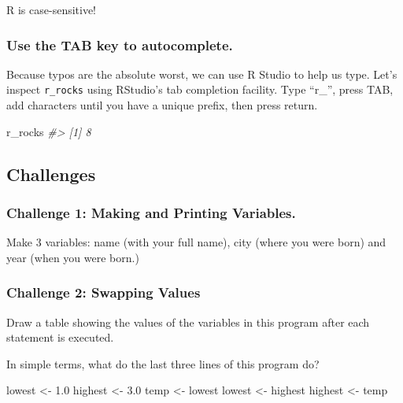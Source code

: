 \documentclass[]{book}
\newenvironment{Shaded}{\begin{snugshade}}{\end{snugshade}}
\newcommand{\CommentTok}[1]{\textcolor[rgb]{0.56,0.35,0.01}{\textit{#1}}}
\newcommand{\FloatTok}[1]{\textcolor[rgb]{0.00,0.00,0.81}{#1}}
\newcommand{\NormalTok}[1]{#1}
\newcommand{\StringTok}[1]{\textcolor[rgb]{0.31,0.60,0.02}{#1}}
\begin{document}
R is case-sensitive!

\hypertarget{use-the-tab-key-to-autocomplete.}{%
\subsubsection*{Use the TAB key to autocomplete.}\label{use-the-tab-key-to-autocomplete.}}

Because typos are the absolute worst, we can use R Studio to help us type. Let's inspect \texttt{r\_rocks} using RStudio's tab completion facility. Type ``r\_'', press TAB, add characters until you have a unique prefix, then press return.

\begin{Shaded}
\begin{Highlighting}[]
\NormalTok{r_rocks}
\CommentTok{#> [1] 8}
\end{Highlighting}
\end{Shaded}

\hypertarget{challenges-2}{%
\subsection{Challenges}\label{challenges-2}}

\hypertarget{challenge-1-making-and-printing-variables.}{%
\subsubsection*{Challenge 1: Making and Printing Variables.}\label{challenge-1-making-and-printing-variables.}}

Make 3 variables: name (with your full name), city (where you were born) and year (when you were born.)

\hypertarget{challenge-2-swapping-values}{%
\subsubsection*{Challenge 2: Swapping Values}\label{challenge-2-swapping-values}}

Draw a table showing the values of the variables in this program after each statement is executed.

In simple terms, what do the last three lines of this program do?

\begin{Shaded}
\begin{Highlighting}[]
\NormalTok{lowest <-}\StringTok{ }\FloatTok{1.0}
\NormalTok{highest <-}\StringTok{ }\FloatTok{3.0}
\NormalTok{temp <-}\StringTok{ }\NormalTok{lowest}
\NormalTok{lowest <-}\StringTok{ }\NormalTok{highest}
\NormalTok{highest <-}\StringTok{ }\NormalTok{temp}
\end{Highlighting}
\end{Shaded}
\end{document}
